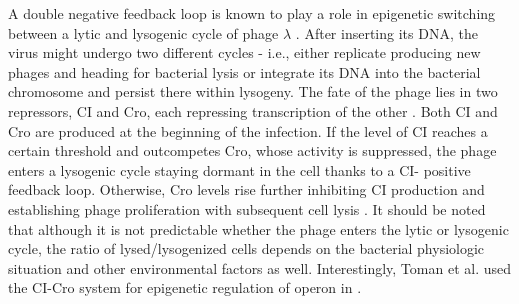 A double negative feedback loop is known to play a role in epigenetic switching between a lytic and lysogenic cycle of  phage $\lambda$ \cite{smits2006phenotypic, casadesus2013programmed}.
After inserting its DNA, the virus might undergo two different cycles - i.e., either replicate producing new phages and heading for bacterial lysis or integrate its DNA into the bacterial chromosome and persist there within lysogeny.
The fate of the phage lies in two repressors, CI and Cro, each repressing transcription of the other \cite{eisen1970regulation, neubauer1970immunity}.
Both CI and Cro are produced at the beginning of the infection.
If the level of CI reaches a certain threshold and outcompetes Cro, whose activity is suppressed, the phage enters a lysogenic cycle staying dormant in the cell thanks to a CI- positive feedback loop.
Otherwise, Cro levels rise further inhibiting CI production and establishing phage proliferation with subsequent cell lysis \cite{svenningsen2005role}.
It should be noted that although it is not predictable whether the phage enters the lytic or lysogenic cycle, the ratio of lysed/lysogenized cells depends on the bacterial physiologic situation and other environmental factors as well.
Interestingly, Toman et al. used the CI-Cro system for epigenetic regulation of  operon in  \cite{toman1985system}.



